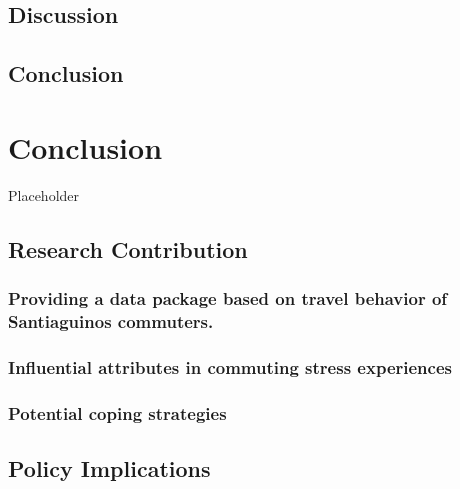 \documentclass[
11pt, %
oneside, %
english, %
singlespacing, %
]{macthesis} %
\begin{document}
\hypertarget{discussion}{%
\section{Discussion}\label{discussion}}

\hypertarget{conclusion}{%
\section{Conclusion}\label{conclusion}}

\hypertarget{conclusion-1}{%
\chapter{Conclusion}\label{conclusion-1}}

Placeholder

\hypertarget{research-contribution}{%
\section{Research Contribution}\label{research-contribution}}

\hypertarget{providing-a-data-package-based-on-travel-behavior-of-santiaguinos-commuters.}{%
\subsection{Providing a data package based on travel behavior of Santiaguinos commuters.}\label{providing-a-data-package-based-on-travel-behavior-of-santiaguinos-commuters.}}

\hypertarget{influential-attributes-in-commuting-stress-experiences}{%
\subsection{Influential attributes in commuting stress experiences}\label{influential-attributes-in-commuting-stress-experiences}}

\hypertarget{potential-coping-strategies}{%
\subsection{Potential coping strategies}\label{potential-coping-strategies}}

\hypertarget{policy-implications}{%
\section{Policy Implications}\label{policy-implications}}
\end{document}
